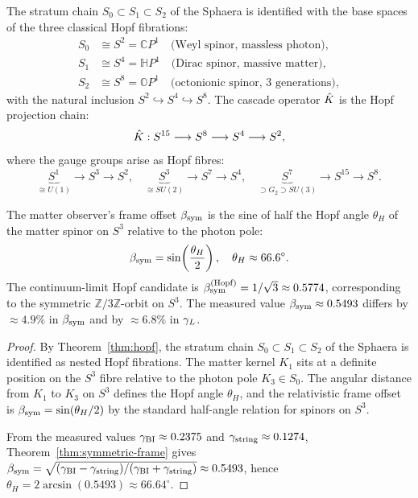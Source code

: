 \begin{theorem}\label{thm:hopf}
The stratum chain $S_0\subset S_1\subset S_2$ of the Sphaera is
identified with the base spaces of the three classical Hopf fibrations:
\begin{align*}
  S_0 &\cong S^2 = \mathbb{C}P^1
       \quad\text{(Weyl spinor, massless photon)},\\
  S_1 &\cong S^4 = \mathbb{H}P^1
       \quad\text{(Dirac spinor, massive matter)},\\
  S_2 &\cong S^8 = \mathbb{O}P^1
       \quad\text{(octonionic spinor, 3 generations)},
\end{align*}
with the natural inclusion $S^2\hookrightarrow S^4\hookrightarrow S^8$.
The cascade operator $\hat{K}$ is the Hopf projection chain:
\[
  \hat{K}: S^{15}\longrightarrow S^8\longrightarrow S^4\longrightarrow S^2,
\]
where the gauge groups arise as Hopf fibres:
\[
  \underbrace{S^1}_{\cong U(1)}\to S^3\to S^2,\quad
  \underbrace{S^3}_{\cong SU(2)}\to S^7\to S^4,\quad
  \underbrace{S^7}_{\supset G_2\supset SU(3)}\to S^{15}\to S^8.
\]
\end{theorem}

\begin{theorem}
\label{thm:bsym-hopf}
The matter observer's frame offset $\beta_{\mathrm{sym}}$ is the sine of half the Hopf
angle $\theta_H$ of the matter spinor on $S^3$ relative to the photon
pole:
\[
  \beta_{\mathrm{sym}} = \sin\!\left(\frac{\theta_H}{2}\right),\quad\theta_H\approx 66.6^\circ.
\]
The continuum-limit Hopf candidate is $\beta_{\mathrm{sym}}^{(\rm Hopf)}=1/\sqrt{3}\approx
0.5774$, corresponding to the symmetric $\mathbb{Z}/3\mathbb{Z}$-orbit
on $S^3$. The measured value $\beta_{\mathrm{sym}}\approx 0.5493$ differs by
$\approx 4.9\%$ in $\beta_{\mathrm{sym}}$ and by $\approx 6.8\%$ in $\gamma_L$.
\end{theorem}

\begin{proof}
By Theorem~\ref{thm:hopf}, the stratum chain
$S_0\subset S_1\subset S_2$ of the Sphaera is identified as nested Hopf
fibrations. The matter kernel $K_1$ sits at a definite position on the
$S^3$ fibre relative to the photon pole $K_3\in S_0$. The angular
distance from $K_1$ to $K_3$ on $S^3$ defines the Hopf angle $\theta_H$,
and the relativistic frame offset is $\beta_{\mathrm{sym}}=\sin(\theta_H/2)$ by the
standard half-angle relation for spinors on $S^3$.

From the measured values $\gamma_{\mathrm{BI}}\approx 0.2375$ and
$\gamma_{\mathrm{string}}\approx 0.1274$, Theorem~\ref{thm:symmetric-frame} gives
$\beta_{\mathrm{sym}}=\sqrt{(\gamma_{\mathrm{BI}}-\gamma_{\mathrm{string}})/(\gamma_{\mathrm{BI}}+\gamma_{\mathrm{string}})}\approx 0.5493$, hence
$\theta_H=2\arcsin(0.5493)\approx 66.64^\circ$.
\end{proof}

